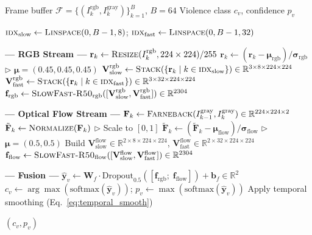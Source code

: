 \documentclass[11pt,a4paper]{article}
\newcommand{\R}{\mathbb{R}}
\newcommand{\softmax}{\mathrm{softmax}}
\begin{document}
\begin{algorithm}[H]
\caption{Dual SlowFast: Violence Detection Forward Pass}\label{alg:violence_forward}
\begin{algorithmic}[1]
\Require Frame buffer $\mathcal{F} = \{(I_k^{\text{rgb}}, I_k^{\text{gray}})\}_{k=1}^B$, $B = 64$
\Ensure Violence class $c_v$, confidence $p_v$

\State $\textsc{idx}_{\text{slow}} \gets \textsc{Linspace}(0, B-1, 8)$; \quad $\textsc{idx}_{\text{fast}} \gets \textsc{Linspace}(0, B-1, 32)$

\Statex \textbf{--- RGB Stream ---}
    \State $\mathbf{r}_k \gets \textsc{Resize}(I_k^{\text{rgb}}, 224 \times 224) / 255$
    \State $\mathbf{r}_k \gets (\mathbf{r}_k - \boldsymbol{\mu}_{\text{rgb}}) / \boldsymbol{\sigma}_{\text{rgb}}$ \hfill $\triangleright$ $\boldsymbol{\mu} = (0.45, 0.45, 0.45)$
\EndFor
\State $\mathbf{V}_{\text{slow}}^{\text{rgb}} \gets \textsc{Stack}(\{\mathbf{r}_k \mid k \in \textsc{idx}_{\text{slow}}\}) \in \R^{3 \times 8 \times 224 \times 224}$
\State $\mathbf{V}_{\text{fast}}^{\text{rgb}} \gets \textsc{Stack}(\{\mathbf{r}_k \mid k \in \textsc{idx}_{\text{fast}}\}) \in \R^{3 \times 32 \times 224 \times 224}$
\State $\mathbf{f}_{\text{rgb}} \gets \textsc{SlowFast-R50}_{\text{rgb}}([\mathbf{V}_{\text{slow}}^{\text{rgb}}, \mathbf{V}_{\text{fast}}^{\text{rgb}}]) \in \R^{2304}$

\Statex \textbf{--- Optical Flow Stream ---}
    \State $\mathbf{F}_k \gets \textsc{Farneback}(I_{k-1}^{\text{gray}}, I_k^{\text{gray}}) \in \R^{224 \times 224 \times 2}$
    \State $\tilde{\mathbf{F}}_k \gets \textsc{Normalize}(\mathbf{F}_k)$ \hfill $\triangleright$ Scale to $[0, 1]$
    \State $\tilde{\mathbf{F}}_k \gets (\tilde{\mathbf{F}}_k - \boldsymbol{\mu}_{\text{flow}}) / \boldsymbol{\sigma}_{\text{flow}}$ \hfill $\triangleright$ $\boldsymbol{\mu} = (0.5, 0.5)$
\EndFor
\State Build $\mathbf{V}_{\text{slow}}^{\text{flow}} \in \R^{2 \times 8 \times 224 \times 224}$, $\mathbf{V}_{\text{fast}}^{\text{flow}} \in \R^{2 \times 32 \times 224 \times 224}$
\State $\mathbf{f}_{\text{flow}} \gets \textsc{SlowFast-R50}_{\text{flow}}([\mathbf{V}_{\text{slow}}^{\text{flow}}, \mathbf{V}_{\text{fast}}^{\text{flow}}]) \in \R^{2304}$

\Statex \textbf{--- Fusion ---}
\State $\hat{\mathbf{y}}_v \gets \mathbf{W}_f \cdot \text{Dropout}_{0.5}([\mathbf{f}_{\text{rgb}};\; \mathbf{f}_{\text{flow}}]) + \mathbf{b}_f \in \R^2$
\State $c_v \gets \arg\max(\softmax(\hat{\mathbf{y}}_v))$; \quad $p_v \gets \max(\softmax(\hat{\mathbf{y}}_v))$
\State Apply temporal smoothing (Eq.~\eqref{eq:temporal_smooth})

\State \Return $(c_v, p_v)$
\end{algorithmic}
\end{algorithm}
\end{document}
